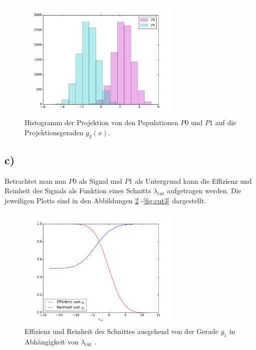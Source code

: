 \begin{figure}
  \centering
  \includegraphics[width=0.7\textwidth]{g_3.pdf}
  \caption{Histogramm der Projektion
   von den Populationen $P0$ und $P1$ auf die Projektionsgeraden $g_3(x)$.}
  \label{fig:histg3}
\end{figure}






\subsection{c)}
\label{subsec:a2c}
Betrachtet man nun $P0$ als Signal und $P1$ als Untergrund kann die
Effizienz und Reinheit des Signals als Funktion eines Schnitts
$\lambda_\mathrm{cut}$ aufgetragen werden.
Die jeweiligen Plotts sind in den Abbildungen \ref{fig:cut1} -\ref{fig:cut3}
dargestellt.

\begin{figure}
  \centering
  \includegraphics[width=0.7\textwidth]{g_1Effizienz.pdf}
  \caption{Effizienz und Reinheit des Schnittes ausgehend von der Gerade $g_1$ in Abhängigkeit von $\lambda_\text{cut}$ .}
  \label{fig:cut1}
\end{figure}



